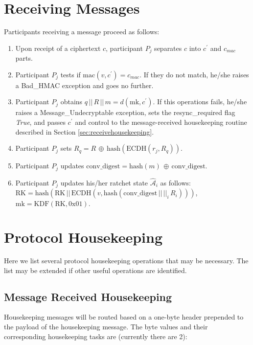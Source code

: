 \documentclass[%
preprint,
amsmath,amssymb,
aps,
prb,
floatfix,
]{revtex4-1}
\begin{document}
\section{\label{sec:receiving}Receiving Messages}
Participants receiving a message proceed as follows:
\begin{enumerate}
\item Upon receipt of a ciphertext $c$, participant $P_j$ separates $c$ into
$c^\prime$ and $c_{mac}$ parts.
\item Participant $P_j$ tests if $\mathrm{mac}(v, c^\prime) = c_{mac}$. If
they do not match, he/she raises a Bad\_HMAC exception and goes no further.
\item Participant $P_j$ obtains $q \, || \, R \, || \, m =
d(\mathrm{mk}, c^\prime)$.
If this operations fails, he/she raises a Message\_Undecryptable
exception, sets the resync\_required flag \textit{True},
and passes $c^\prime$ and control to the message-received housekeeping routine described in
Section \ref{sec:receivehousekeeping}.
\item Participant $P_j$ sets $R_q = R \, \oplus \,
\mathrm{hash}(\mathrm{ECDH}(r_j, R_q))$.
\item Participant $P_j$ updates $\mathrm{conv\_digest} = \mathrm{hash}(m) \, \oplus \, \mathrm{conv\_digest}$.
\item Participant $P_j$ updates his/her ratchet state $\mathcal{\hat{A}}_i$ as
follows: \\
$\mathrm{RK} = \mathrm{hash}(\mathrm{RK} \, || \, \mathrm{ECDH}(v,
\mathrm{hash}(\mathrm{conv\_digest} \, || \, ||_i \, R_i)))$, \\
$\mathrm{mk} = \mathrm{KDF}(\mathrm{RK}, 0\mathrm{x}01)$.

\end{enumerate}

\section{\label{sec:housekeeping}Protocol Housekeeping}
Here we list several protocol housekeeping operations that may be necessary.
The list may be extended if other useful operations are identified.

\subsection{\label{sec:receivehousekeeping}Message Received Housekeeping}
Housekeeping messages will be routed based on a one-byte header prepended to the
payload of the housekeeping message. The byte values and their corresponding
housekeeping tasks are (currently there are 2): \\
\end{document}
